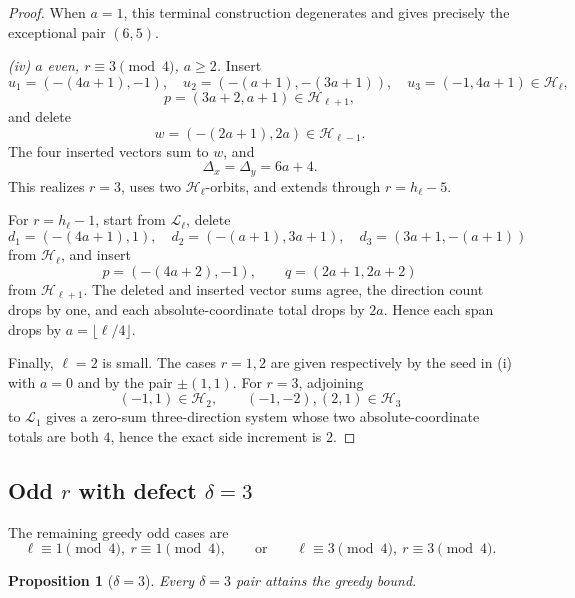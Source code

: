 \documentclass[11pt]{article}
\newtheorem{proposition}[theorem]{Proposition}
\theoremstyle{definition}
\newcommand{\HH}{\mathcal H}
\newcommand{\LL}{\mathcal L}
\begin{document}
\begin{proof}
When \(a=1\), this terminal construction degenerates and gives precisely the exceptional pair \((6,5)\).

\smallskip
\noindent\emph{(iv) \(a\) even, \(r\equiv3\pmod4\), \(a\ge2\).}
Insert
\[
u_1=(-(4a+1),-1),\quad
u_2=(-(a+1),-(3a+1)),\quad
u_3=(-1,4a+1)\in\HH_\ell,
\]
\[
p=(3a+2,a+1)\in\HH_{\ell+1},
\]
and delete
\[
w=(-(2a+1),2a)\in\HH_{\ell-1}.
\]
The four inserted vectors sum to \(w\), and
\[
\Delta_x=\Delta_y=6a+4.
\]
This realizes \(r=3\), uses two \(\HH_\ell\)-orbits, and extends through \(r=h_\ell-5\).

For \(r=h_\ell-1\), start from \(\LL_\ell\), delete
\[
d_1=(-(4a+1),1),\quad
d_2=(-(a+1),3a+1),\quad
d_3=(3a+1,-(a+1))
\]
from \(\HH_\ell\), and insert
\[
p=(-(4a+2),-1),\qquad
q=(2a+1,2a+2)
\]
from \(\HH_{\ell+1}\).  The deleted and inserted vector sums agree, the direction count drops by one, and each absolute-coordinate total drops by \(2a\).  Hence each span drops by \(a=\lfloor\ell/4\rfloor\).

Finally, \(\ell=2\) is small.  The cases \(r=1,2\) are given respectively by the seed in (i) with \(a=0\) and by the pair \(\pm(1,1)\).  For \(r=3\), adjoining
\[
(-1,1)\in\HH_2,\qquad
(-1,-2),(2,1)\in\HH_3
\]
to \(\LL_1\) gives a zero-sum three-direction system whose two absolute-coordinate totals are both \(4\), hence the exact side increment is \(2\).
\end{proof}

\subsection{Odd \(r\) with defect \(\delta=3\)}

The remaining greedy odd cases are
\[
\ell\equiv1\pmod4,\ r\equiv1\pmod4,
\qquad\text{or}\qquad
\ell\equiv3\pmod4,\ r\equiv3\pmod4.
\]

\begin{proposition}[\(\delta=3\)]\label{prop:delta3}
Every \(\delta=3\) pair attains the greedy bound.
\end{proposition}
\end{document}
